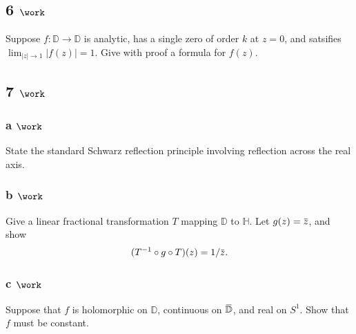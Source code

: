 \hypertarget{work-72}{%
\subsection{\texorpdfstring{6
\(\work\)}{6 \textbackslash work}}\label{work-72}}

Suppose \(f:{\mathbb{D}}\to{\mathbb{D}}\) is analytic, has a single zero
of order \(k\) at \(z=0\), and satsifies
\(\lim_{{\left\lvert {z} \right\rvert} \to 1} {\left\lvert {f(z)} \right\rvert} = 1\).
Give with proof a formula for \(f(z)\).

\hypertarget{work-73}{%
\subsection{\texorpdfstring{7
\(\work\)}{7 \textbackslash work}}\label{work-73}}

\hypertarget{a-work-6}{%
\subsubsection{\texorpdfstring{a
\(\work\)}{a \textbackslash work}}\label{a-work-6}}

State the standard Schwarz reflection principle involving reflection
across the real axis.

\hypertarget{b-work-8}{%
\subsubsection{\texorpdfstring{b
\(\work\)}{b \textbackslash work}}\label{b-work-8}}

Give a linear fractional transformation \(T\) mapping \({\mathbb{D}}\)
to \({\mathbb{H}}\). Let
\(g(z) = \mkern 1.5mu\overline{\mkern-1.5muz\mkern-1.5mu}\mkern 1.5mu\),
and show
\begin{align*}  
(T^{-1} \circ g \circ T)(z) = 1/\mkern 1.5mu\overline{\mkern-1.5muz\mkern-1.5mu}\mkern 1.5mu
.\end{align*}

\hypertarget{c-work-6}{%
\subsubsection{\texorpdfstring{c
\(\work\)}{c \textbackslash work}}\label{c-work-6}}

Suppose that \(f\) is holomorphic on \({\mathbb{D}}\), continuous on
\(\mkern 1.5mu\overline{\mkern-1.5mu{\mathbb{D}}\mkern-1.5mu}\mkern 1.5mu\),
and real on \(S^1\). Show that \(f\) must be constant.

